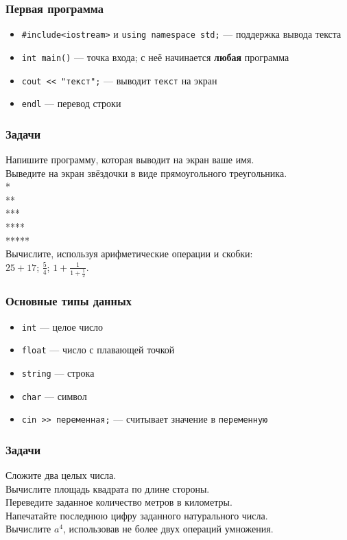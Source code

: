 \documentclass[PDF,10pt,usenames,dvipsnames]{beamer}
\newcommand{\bigqm}[1][1]{\text{\larger[#1]{\textbf{?}}}}
\newcommand{\cpp}[1]{\textcolor{blue!40!black}{\tt #1}} %
\newcommand{\prblm}[1]{{\rm\bigqm[1]} {#1 \\} \vspace{10pt}} %
\begin{document}
\begin{frame}[t] 
	\frametitle{Первая программа} 
	\begin{itemize}
		\item	\cpp{\#include<iostream>} и \cpp{using namespace std;} --- поддержка вывода текста 
		\item	\cpp{int main()} --- точка входа; с неё начинается {\bf любая} программа 
		\item	\cpp{cout << "текст";} --- выводит \cpp{текст} на экран 
		\item	\cpp{endl} --- перевод строки 
	\end{itemize}
\end{frame}

\begin{frame}[t]
	\frametitle{Задачи} 
	\prblm{Напишите программу, которая выводит на экран ваше имя.} 
	\prblm{Выведите на экран звёздочки в виде прямоугольного треугольника. \\ *\\ ** \\ *** \\ **** \\ *****} 
	\prblm{Вычислите, используя арифметические операции и скобки: \\ \vspace{5pt} $25+17$; \hspace{12pt} $\frac{5}{4}$; \hspace{12pt} $1+\frac{1}{1+\frac{1}{2}}$.} 
\end{frame}

\begin{frame}[t]
	\frametitle{Основные типы данных} 
	\begin{itemize}
		\item \cpp{int} --- целое число 
		\item \cpp{float} --- число с плавающей точкой 
		\item \cpp{string} --- строка 
		\item \cpp{char} --- символ 
		\item	\cpp{cin >> переменная;} --- считывает значение в \cpp{переменную}
	\end{itemize}
\end{frame}

\begin{frame}[t]
	\frametitle{Задачи} 
	\prblm{Сложите два целых числа.} 
	\prblm{Вычислите площадь квадрата по длине стороны.} 
	\prblm{Переведите заданное количество метров в километры.} 
	\prblm{Напечатайте последнюю цифру заданного натурального числа.} 
	\prblm{Вычислите $a^4$, использовав не более двух операций умножения.} 
\end{frame}
\end{document}
